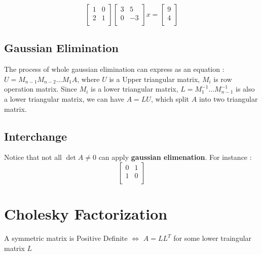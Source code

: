 \[
    \begin{bmatrix}
        1 & 0 \\ 
        2 & 1 \\ 
    \end{bmatrix}
    \begin{bmatrix}
        3 & 5 \\ 
        0 & -3 \\ 
    \end{bmatrix}
    x=\begin{bmatrix}9 \\ 4 \\ \end{bmatrix}
\]

\subsection{Gaussian Elimination}

The process of whole gaussian elimination can express as an equation :
$U = M_{n-1}M_{n-2} \dots M_1 A $, where $U$ is a Upper triangular matrix,
$M_i$ is row operation matrix. Since $M_i$ is a lower triangular matrix,
$L = M_1^{-1} \dots M_{n-1}^{-1}$ is also a lower triangular matrix,
we can have $A = LU$, which split $A$ into two triangular matrix.

\subsection{Interchange}

Notice that not all $\det A \neq 0$ can apply \textbf{gaussian elimenation}.
For instance : 
\[
    \begin{bmatrix}
        0 & 1 \\
        1 & 0 \\
    \end{bmatrix}
\]

\section{Cholesky Factorization}

\begin{theorem}
    A symmetric matrix is Positive Definite $\Leftrightarrow$
    $A = LL^T$ for some lower traingular matrix $L$
\end{theorem}


